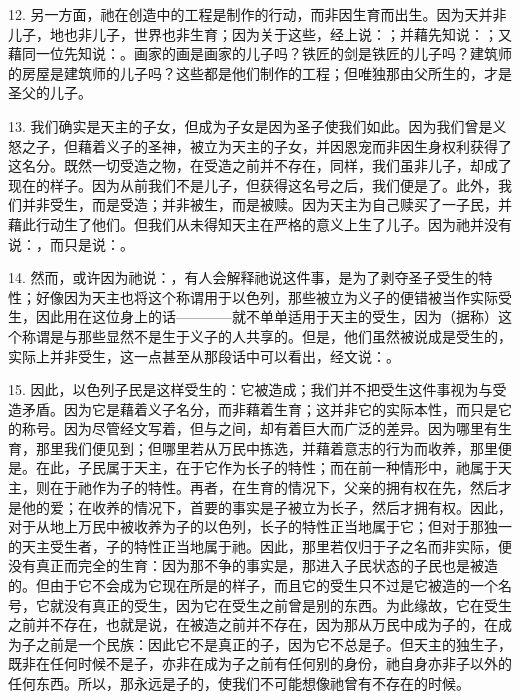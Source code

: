 12. 另一方面，祂在创造中的工程是制作的行动，而非因生育而出生。因为天并非儿子，地也非儿子，世界也非生育；因为关于这些，经上说：；并藉先知说：；又藉同一位先知说：。画家的画是画家的儿子吗？铁匠的剑是铁匠的儿子吗？建筑师的房屋是建筑师的儿子吗？这些都是他们制作的工程；但唯独那由父所生的，才是圣父的儿子。\par

13. 我们确实是天主的子女，但成为子女是因为圣子使我们如此。因为我们曾是义怒之子，但藉着义子的圣神，被立为天主的子女，并因恩宠而非因生身权利获得了这名分。既然一切受造之物，在受造之前并不存在，同样，我们虽非儿子，却成了现在的样子。因为从前我们不是儿子，但获得这名号之后，我们便是了。此外，我们并非受生，而是受造；并非被生，而是被赎。因为天主为自己赎买了一子民，并藉此行动生了他们。但我们从未得知天主在严格的意义上生了儿子。因为祂并没有说：，而只是说：。\par

14. 然而，或许因为祂说：，有人会解释祂说这件事，是为了剥夺圣子受生的特性；好像因为天主也将这个称谓用于以色列，那些被立为义子的便错被当作实际受生，因此用在这位身上的话————就不单单适用于天主的受生，因为（据称）这个称谓是与那些显然不是生于义子的人共享的。但是，他们虽然被说成是受生的，实际上并非受生，这一点甚至从那段话中可以看出，经文说：。\par

15. 因此，以色列子民是这样受生的：它被造成；我们并不把受生这件事视为与受造矛盾。因为它是藉着义子名分，而非藉着生育；这并非它的实际本性，而只是它的称号。因为尽管经文写着，但与之间，却有着巨大而广泛的差异。因为哪里有生育，那里我们便见到；但哪里若从万民中拣选，并藉着意志的行为而收养，那里便是。在此，子民属于天主，在于它作为长子的特性；而在前一种情形中，祂属于天主，则在于祂作为子的特性。再者，在生育的情况下，父亲的拥有权在先，然后才是他的爱；在收养的情况下，首要的事实是子被立为长子，然后才拥有权。因此，对于从地上万民中被收养为子的以色列，长子的特性正当地属于它；但对于那独一的天主受生者，子的特性正当地属于祂。因此，那里若仅归于子之名而非实际，便没有真正而完全的生育：因为那不争的事实是，那进入子民状态的子民也是被造的。但由于它不会成为它现在所是的样子，而且它的受生只不过是它被造的一个名号，它就没有真正的受生，因为它在受生之前曾是别的东西。为此缘故，它在受生之前并不存在，也就是说，在被造之前并不存在，因为那从万民中成为子的，在成为子之前是一个民族：因此它不是真正的子，因为它不总是子。但天主的独生子，既非在任何时候不是子，亦非在成为子之前有任何别的身份，祂自身亦非子以外的任何东西。所以，那永远是子的，使我们不可能想像祂曾有不存在的时候。\par

